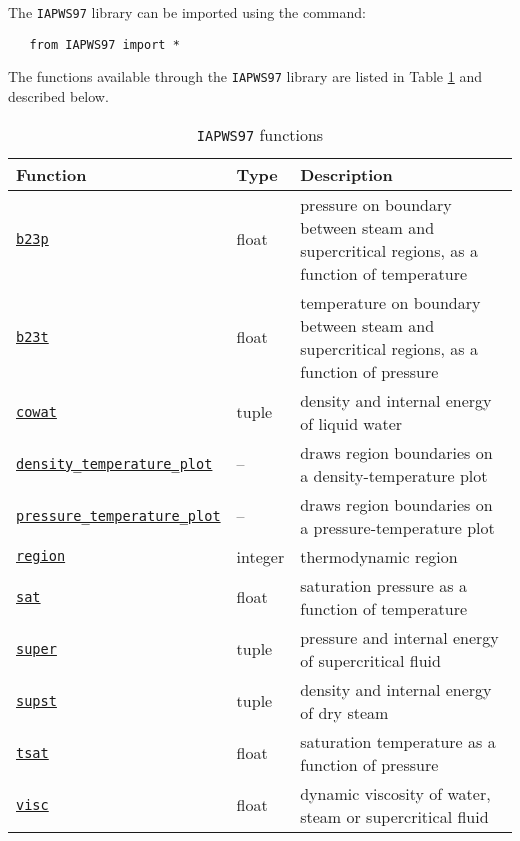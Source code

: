 The \texttt{IAPWS97} library can be imported using the command:

\begin{lstlisting} 
   from IAPWS97 import *
\end{lstlisting}

The functions available through the \texttt{IAPWS97} library are listed in Table \ref{tb:iapws97_functions} and described below.

\begin{table}
  \begin{center}
    \begin{tabular}{|l|l|p{65mm}|}
      \hline
      \textbf{Function} & \textbf{Type} & \textbf{Description}\\
      \hline
      \hyperref[sec:iapws97:b23p]{\texttt{b23p}} & float & pressure on boundary between steam and supercritical regions, as a function of temperature\\
      \hyperref[sec:iapws97:b23t]{\texttt{b23t}} & float & temperature on boundary between steam and supercritical regions, as a function of pressure\\
      \hyperref[sec:iapws97:cowat]{\texttt{cowat}} & tuple & density and internal energy of liquid water\\
      \hyperref[sec:iapws97:density_temperature_plot]{\texttt{density\_temperature\_plot}} & -- & draws region boundaries on a density-temperature plot\\
      \hyperref[sec:iapws97:pressure_temperature_plot]{\texttt{pressure\_temperature\_plot}} & -- & draws region boundaries on a pressure-temperature plot\\
      \hyperref[sec:iapws97:region]{\texttt{region}} & integer & thermodynamic region\\
      \hyperref[sec:iapws97:sat]{\texttt{sat}} & float & saturation pressure as a function of temperature\\
      \hyperref[sec:iapws97:super]{\texttt{super}} & tuple & pressure and internal energy of supercritical fluid\\
      \hyperref[sec:iapws97:supst]{\texttt{supst}} & tuple & density and internal energy of dry steam\\
      \hyperref[sec:iapws97:tsat]{\texttt{tsat}} & float & saturation temperature as a function of pressure\\
      \hyperref[sec:iapws97:visc]{\texttt{visc}} & float & dynamic viscosity of water, steam or supercritical fluid\\
      \hline
    \end{tabular}
    \caption{\texttt{IAPWS97} functions}
    \label{tb:iapws97_functions}
  \end{center}
\end{table}

